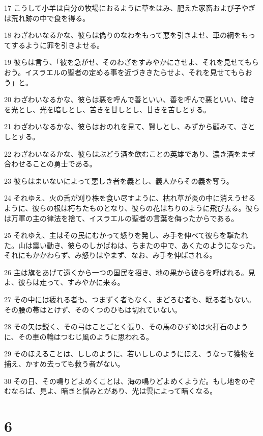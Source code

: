 \par 17 こうして小羊は自分の牧場におるように草をはみ、肥えた家畜および子やぎは荒れ跡の中で食を得る。
\par 18 わざわいなるかな、彼らは偽りのなわをもって悪を引きよせ、車の綱をもってするように罪を引きよせる。
\par 19 彼らは言う、「彼を急がせ、そのわざをすみやかにさせよ、それを見せてもらおう。イスラエルの聖者の定める事を近づききたらせよ、それを見せてもらおう」と。
\par 20 わざわいなるかな、彼らは悪を呼んで善といい、善を呼んで悪といい、暗きを光とし、光を暗しとし、苦きを甘しとし、甘きを苦しとする。
\par 21 わざわいなるかな、彼らはおのれを見て、賢しとし、みずから顧みて、さとしとする。
\par 22 わざわいなるかな、彼らはぶどう酒を飲むことの英雄であり、濃き酒をまぜ合わせることの勇士である。
\par 23 彼らはまいないによって悪しき者を義とし、義人からその義を奪う。
\par 24 それゆえ、火の舌が刈り株を食い尽すように、枯れ草が炎の中に消えうせるように、彼らの根は朽ちたものとなり、彼らの花はちりのように飛び去る。彼らは万軍の主の律法を捨て、イスラエルの聖者の言葉を侮ったからである。
\par 25 それゆえ、主はその民にむかって怒りを発し、み手を伸べて彼らを撃たれた。山は震い動き、彼らのしかばねは、ちまたの中で、あくたのようになった。それにもかかわらず、み怒りはやまず、なお、み手を伸ばされる。
\par 26 主は旗をあげて遠くから一つの国民を招き、地の果から彼らを呼ばれる。見よ、彼らは走って、すみやかに来る。
\par 27 その中には疲れる者も、つまずく者もなく、まどろむ者も、眠る者もない。その腰の帯はとけず、そのくつのひもは切れていない。
\par 28 その矢は鋭く、その弓はことごとく張り、その馬のひずめは火打石のように、その車の輪はつむじ風のように思われる。
\par 29 そのほえることは、ししのように、若いししのようにほえ、うなって獲物を捕え、かすめ去っても救う者がない。
\par 30 その日、その鳴りどよめくことは、海の鳴りどよめくようだ。もし地をのぞむならば、見よ、暗きと悩みとがあり、光は雲によって暗くなる。

\chapter{6}

